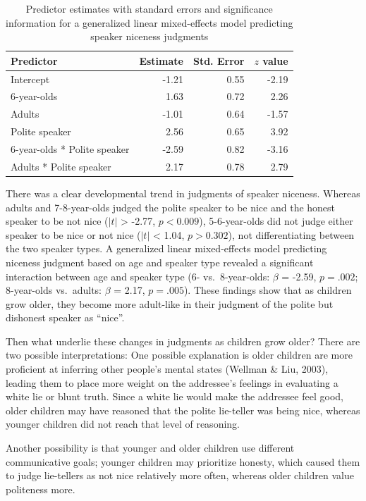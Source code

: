 \documentclass[a4paper,man,apacite,floatsintext]{apa6}
\begin{document}
\begin{table}[h]
\centering
\begin{tabular}{lrrr}
 Predictor & Estimate & Std. Error & $z$ value \\ 
  \hline
Intercept & -1.21 & 0.55 & -2.19 \\ 
  6-year-olds & 1.63 & 0.72 & 2.26 \\ 
  Adults & -1.01 & 0.64 & -1.57 \\ 
  Polite speaker & 2.56 & 0.65 & 3.92 \\ 
  6-year-olds * Polite speaker & -2.59 & 0.82 & -3.16 \\ 
  Adults * Polite speaker & 2.17 & 0.78 & 2.79 \\ 
   \hline
\end{tabular}
\caption{Predictor estimates with standard errors and significance information for a generalized linear mixed-effects model predicting speaker niceness judgments} 
\label{tab:nice_tab}
\end{table}

There was a clear developmental trend in judgments of speaker niceness.
Whereas adults and 7-8-year-olds judged the polite speaker to be nice
and the honest speaker to be not nice (\(|t|\) \textgreater{} -2.77,
\(p <0.009\)), 5-6-year-olds did not judge either speaker to be nice or
not nice (\(|t|\) \textless{} 1.04, \(p >0.302\)), not differentiating
between the two speaker types. A generalized linear mixed-effects model
predicting niceness judgment based on age and speaker type revealed a
significant interaction between age and speaker type (6-
vs.~8-year-olds: \(\beta\) = -2.59, \(p =.002\); 8-year-olds vs.~adults:
\(\beta\) = 2.17, \(p =.005\)). These findings show that as children
grow older, they become more adult-like in their judgment of the polite
but dishonest speaker as ``nice''.

Then what underlie these changes in judgments as children grow older?
There are two possible interpretations: One possible explanation is
older children are more proficient at inferring other people's mental
states (Wellman \& Liu, 2003), leading them to place more weight on the
addressee's feelings in evaluating a white lie or blunt truth. Since a
white lie would make the addressee feel good, older children may have
reasoned that the polite lie-teller was being nice, whereas younger
children did not reach that level of reasoning.

Another possibility is that younger and older children use different
communicative goals; younger children may prioritize honesty, which
caused them to judge lie-tellers as not nice relatively more often,
whereas older children value politeness more.
\end{document}
